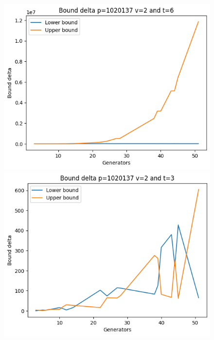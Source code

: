 \documentclass{article}
\begin{document}
\begin{figure}[H]
\begin{minipage}{.49\textwidth}
            \includegraphics[width=\textwidth]{../plots/tuples_figures/delta_1020137v2_large/Bound delta p=1020137 v=2 and t=6.png}
    \end{minipage}
    \begin{minipage}{.49\textwidth}
            \centering
            \includegraphics[width=\textwidth]{../plots/tuples_figures/delta_1020137v2_large/Bound delta p=1020137 v=2 and t=3.png}

\end{minipage}
\end{figure}
\end{document}
